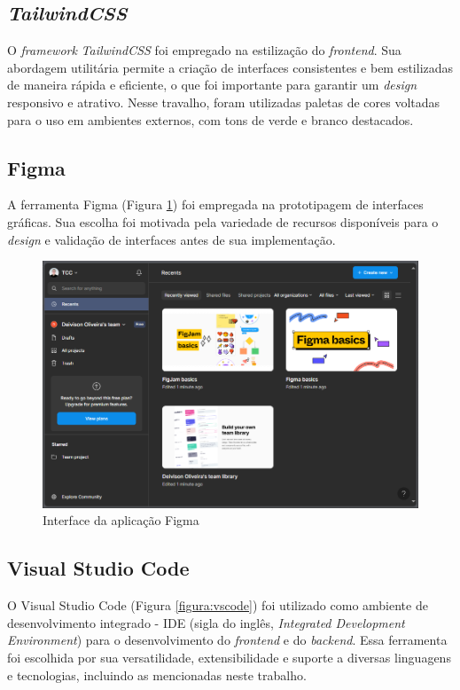 \subsection{\textit{TailwindCSS}}
O \textit{framework} \textit{TailwindCSS} foi empregado na estilização do \textit{frontend}. Sua abordagem utilitária permite a criação de interfaces consistentes e bem estilizadas de maneira rápida e eficiente, o que foi importante para garantir um \textit{design} responsivo e atrativo. Nesse travalho, foram utilizadas paletas de cores voltadas para o uso em ambientes externos, com tons de verde e branco destacados.

\subsection{Figma}
A ferramenta Figma (Figura \ref{figura:figma}) foi empregada na prototipagem de interfaces gráficas. Sua escolha foi motivada pela variedade de recursos disponíveis para o \textit{design} e validação de interfaces antes de sua implementação.

\begin{figure}[!htb] \centering
  \caption{Interface da aplicação Figma} \label{figura:figma}
  \begin{varwidth}{\linewidth}
    \includegraphics[width=16cm]{figuras/figma.png}
  \end{varwidth}
\end{figure}

\subsection{Visual Studio Code}
O Visual Studio Code (Figura \ref{figura:vscode}) foi utilizado como ambiente de desenvolvimento integrado - IDE (sigla do inglês, \textit{Integrated Development Environment}) para o desenvolvimento do \textit{frontend} e do \textit{backend}. Essa ferramenta foi escolhida por sua versatilidade, extensibilidade e suporte a diversas linguagens e tecnologias, incluindo as mencionadas neste trabalho.

